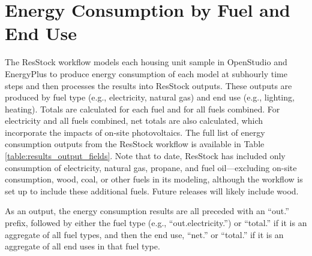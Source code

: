 \section{Energy Consumption by Fuel and End Use}
The ResStock workflow models each housing unit sample in OpenStudio and EnergyPlus to produce energy consumption of each model at subhourly time steps and then processes the results into ResStock outputs. These outputs are produced by fuel type (e.g., electricity, natural gas) and end use (e.g., lighting, heating). Totals are calculated for each fuel and for all fuels combined. For electricity and all fuels combined, net totals are also calculated, which incorporate the impacts of on-site photovoltaics. The full list of energy consumption outputs from the ResStock workflow is available in Table \ref{table:results_output_fields}. Note that to date, ResStock has included only consumption of electricity, natural gas, propane, and fuel oil---excluding on-site consumption, wood, coal, or other fuels in its modeling, although the workflow is set up to include these additional fuels. Future releases will likely include wood.

As an output, the energy consumption results are all preceded with an ``out.'' prefix, followed by either the fuel type (e.g., ``out.electricity.'') or ``total.'' if it is an aggregate of all fuel types, and then the end use, ``net.''  or ``total.'' if it is an aggregate of all end uses in that fuel type.

